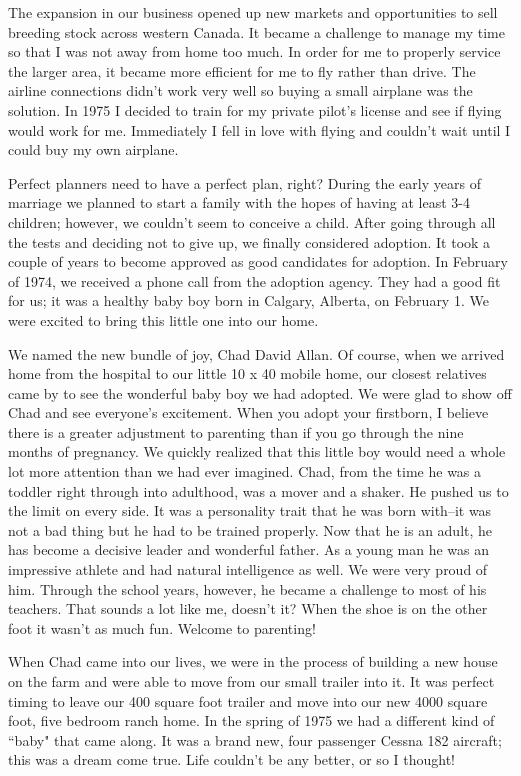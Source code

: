 \documentclass[oneside,12pt]{book}
\begin{document}
The expansion in our business opened up new markets and opportunities to sell breeding stock across western Canada. It became a challenge to manage my time so that I was not away from home too much. In order for me to properly service the larger area, it became more efficient for me to fly rather than drive. The airline connections didn't work very well so buying a small airplane was the solution. In 1975 I decided to train for my private pilot's license and see if flying would work for me. Immediately I fell in love with flying and couldn't wait until I could buy my own airplane.

Perfect planners need to have a perfect plan, right? During the early years of marriage we planned to start a family with the hopes of having at least 3-4 children; however, we couldn't seem to conceive a child. After going through all the tests and deciding not to give up, we finally considered adoption. It took a couple of years to become approved as good candidates for adoption. In February of 1974, we received a phone call from the adoption agency. They had a good fit for us; it was a healthy baby boy born in Calgary, Alberta, on February 1. We were excited to bring this little one into our home.

We named the new bundle of joy, Chad David Allan. Of course, when we arrived home from the hospital to our little 10 x 40 mobile home, our closest relatives came by to see the wonderful baby boy we had adopted. We were glad to show off Chad and see everyone's excitement. When you adopt your firstborn, I believe there is a greater adjustment to parenting than if you go through the nine months of pregnancy. We quickly realized that this little boy would need a whole lot more attention than we had ever imagined. Chad, from the time he was a toddler right through into adulthood, was a mover and a shaker. He pushed us to the limit on every side. It was a personality trait that he was born with--it was not a bad thing but he had to be trained properly. Now that he is an adult, he has become a decisive leader and wonderful father. As a young man he was an impressive athlete and had natural intelligence as well. We were very proud of him. Through the school years, however, he became a challenge to most of his teachers. That sounds a lot like me, doesn't it?  When the shoe is on the other foot it wasn't as much fun. Welcome to parenting! 

When Chad came into our lives, we were in the process of building a new house on the farm and were able to move from our small trailer into it. It was perfect timing to leave our 400 square foot trailer and move into our new 4000 square foot, five bedroom ranch home. In the spring of 1975 we had a different kind of ``baby" that came along. It was a brand new, four passenger Cessna 182 aircraft; this was a dream come true. Life couldn't be any better, or so I thought!
\end{document}
